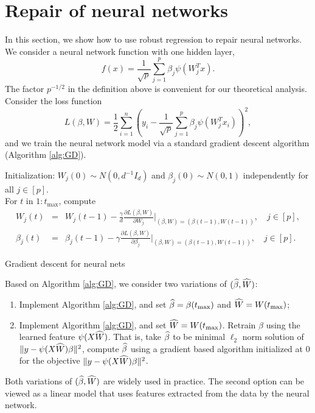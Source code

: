 


\section{Repair of neural networks}
\label{sec:neural}

In this section, we show how to use robust regression to repair neural networks.
We consider a neural network function with one hidden layer,
$$f(x)=\frac{1}{\sqrt{p}}\sum_{j=1}^p\beta_j\psi(W_j^Tx).$$
The factor $p^{-1/2}$ in the definition above is convenient for our theoretical analysis.
Consider the loss function
$$L(\beta,W)=\frac{1}{2}\sum_{i=1}^n\left(y_i - \frac{1}{\sqrt{p}}\sum_{j=1}^p\beta_j\psi(W_j^Tx_i)\right)^2,$$
and we train the neural network model via a standard gradient descent algorithm (Algorithm \ref{alg:GD}).
\begin{algorithm}[H]
\DontPrintSemicolon
{}
\nl Initialization: $W_j(0)\sim N(0,d^{-1}I_d)$ and $\beta_j(0)\sim N(0,1)$ independently for all $j\in[p]$. \\
\nl For $t$ in $1:t_{\max}$, compute 
\begin{eqnarray*}
W_j(t) &=& W_j(t-1) - \frac{\gamma}{d}\frac{\partial L(\beta,W)}{\partial W_j}|_{(\beta,W)=(\beta(t-1),W(t-1))}, \quad j\in[p], \\
\beta_j(t) &=& \beta_j(t-1) - \gamma\frac{\partial L(\beta,W)}{\partial \beta_j}|_{(\beta,W)=(\beta(t-1),W(t-1))}, \quad j\in[p].
\end{eqnarray*}
 \caption{Gradient descent for neural nets}\label{alg:GD}
\end{algorithm}
Based on Algorithm \ref{alg:GD}, we consider two variations of $(\widehat{\beta},\widehat{W})$:
\begin{enumerate}
\item Implement Algorithm \ref{alg:GD}, and set $\widehat{\beta}=\beta(t_{\max})$ and $\widehat{W}=W(t_{\max})$;
\item Implement Algorithm \ref{alg:GD}, and set $\widehat{W}=W(t_{\max})$. Retrain $\beta$ using the learned feature $\psi(X\widehat{W})$. That is, take $\widehat{\beta}$ to be minimal $\ell_2$ norm solution of $\|y-\psi(X\widehat{W})\beta\|^2$, compute $\widehat{\beta}$ using a gradient based algorithm initialized at $0$ for the objective $\|y-\psi(X\widehat{W})\beta\|^2$.
\end{enumerate}
Both variations of $(\widehat{\beta},\widehat{W})$ are widely used in practice. The second option can be viewed as a linear model that uses features extracted from the data by the neural network.

